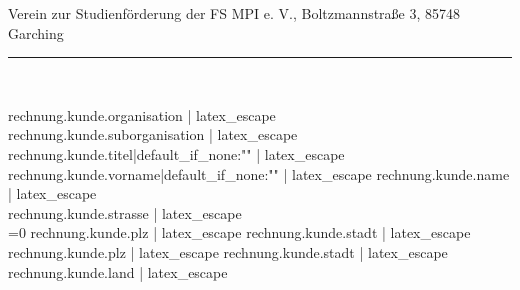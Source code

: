 \documentclass[a4paper,12pt,top=1.5cm,bottom=1.5cm]{article}
\begin{document}
    \raggedright{\parbox[c]{8cm}{
        \raggedright \scriptsize
        Verein zur Studienförderung der FS MPI e. V.,
        Boltzmannstraße 3, 85748 Garching\\[1ex] \hrule}}\\[2ex]
    \raggedright{\parbox[c]{8cm}{\footnotesize
        { {{ rechnung.kunde.organisation | latex_escape }}\\[0.5ex]}{}
        { {{ rechnung.kunde.suborganisation | latex_escape }} \\[0.2ex]}{}
        { {{ rechnung.kunde.titel|default_if_none:"" | latex_escape }} {{ rechnung.kunde.vorname|default_if_none:"" | latex_escape }} {{ rechnung.kunde.name | latex_escape }}  \\[0.2ex]}{}
    {{ rechnung.kunde.strasse | latex_escape }} \\[0.2ex]
    \ifnum{}=0
        {{ rechnung.kunde.plz | latex_escape }} {{ rechnung.kunde.stadt | latex_escape }}\\[3ex]
    \else
        {{ rechnung.kunde.plz | latex_escape }} {{ rechnung.kunde.stadt | latex_escape }}\\[0.2ex]
        {{ rechnung.kunde.land | latex_escape }} \\[3ex]
    \fi
    }}
\end{document}
